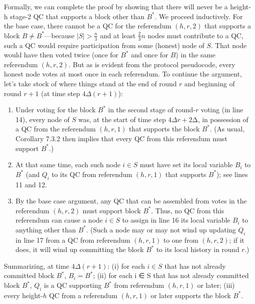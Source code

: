 Formally, we can complete the proof by showing that there will never be a height-h stage-2 QC that supports a block other than $B^*$. We proceed inductively. For the base
case, there cannot be a QC for the referendum $(h, r, 2)$ that supports a block $B \neq B^*$—because $|S| > \frac{n}{3}$ and at least $\frac{2}{3}n$ nodes must contribute to a QC, such a QC would require
participation from some (honest) node of $S$. That node would have then voted twice (once
for $B^*$ and once for $B$) in the same referendum $(h, r, 2)$. But as is evident from the protocol
pseudocode, every honest node votes at most once in each referendum.
To continue the argument, let’s take stock of where things stand at the end of round $r$
and beginning of round $r + 1$ (at time step $4\Delta(r + 1)$):
\begin{enumerate}
    \item Under voting for the block $B^*$
    in the second stage of round-$r$ voting (in line 14),
    every node of $S$ was, at the start of time step $4\Delta r+2∆$, in possession of a QC from the
    referendum $(h, r, 1)$ that supports the block $B^*$. (As usual, Corollary 7.3.2 then implies
    that every QC from this referendum must support $B^*$.)
    \item At that same time, each such node $i \in S$ must have set its local variable $B_i$ to $B^*$
    (and $Q_i$ to its QC from referendum $(h, r, 1)$ that supports $B^*$); see lines 11 and 12.
    \item By the base case argument, any QC that can be assembled from votes in the referendum $(h, r, 2)$ must support block $B^*$. Thus, no QC from this referendum can cause a node $i \in S$ to assign in line 16 its local variable $B_i$ to anything other than $B^*$. (Such a node may or may not wind up updating $Q_i$ in line 17 from a QC from referendum $(h, r, 1)$ to one from $(h, r, 2)$; if it does, it will wind up committing the block $B^*$
    to its local history in round $r$.)
\end{enumerate}
Summarizing, at time $4\Delta(r+1)$: (i) for each $i \in S$ that has not already committed block $B^*$, $B_i = B^*$; (ii) for each i ∈ S that has not already committed block $B^*$, $Q_i$ is a QC supporting $B^*$ from referendum $(h, r, 1)$ or later; (iii) every height-$h$ QC from a referendum $(h, r, 1)$ or later supports the block $B^*$.\\

